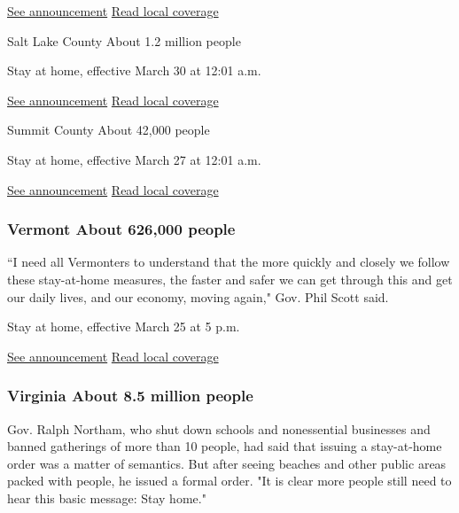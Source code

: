 \href{http://www.co.davis.ut.us/docs/librariesprovider5/covid-19/public-health-order-4-1-20/public-health-order-april-1-2020.pdf?sfvrsn=4b453153_2}{See
announcement} \textbar{}
\href{https://www.sltrib.com/news/2020/04/01/davis-county-issues/}{Read
local coverage}

Salt Lake County About 1.2 million people

Stay at home, effective March 30 at 12:01 a.m.

\href{https://slco.org/globalassets/1-site-files/health/programs/covid/pho/pho3.pdf}{See
announcement} \textbar{}
\href{https://www.sltrib.com/news/2020/03/29/coronavirus-cases-utah/}{Read
local coverage}

Summit County About 42,000 people

Stay at home, effective March 27 at 12:01 a.m.

\href{https://summitcountyhealth.org/public-announcements/3-25-20-summit-county-issues-stay-at-home-order-to-residents/}{See
announcement} \textbar{}
\href{https://www.sltrib.com/news/2020/03/25/summit-county-orders/}{Read
local coverage}

\hypertarget{vermont-about-626000-people}{%
\subsubsection{Vermont About 626,000
people}\label{vermont-about-626000-people}}

``I need all Vermonters to understand that the more quickly and closely
we follow these stay-at-home measures, the faster and safer we can get
through this and get our daily lives, and our economy, moving again,"
Gov. Phil Scott said.

Stay at home, effective March 25 at 5 p.m.

\href{https://governor.vermont.gov/sites/scott/files/documents/ADDENDUM\%206\%20TO\%20EXECUTIVE\%20ORDER\%2001-20.pdf}{See
announcement} \textbar{}
\href{https://www.burlingtonfreepress.com/story/news/local/2020/03/24/vermont-gov-phil-scott-all-vermonters-should-stay-home-order/2909062001/}{Read
local coverage}

\hypertarget{virginia-about-85-million-people}{%
\subsubsection{Virginia About 8.5 million
people}\label{virginia-about-85-million-people}}

Gov. Ralph Northam, who shut down schools and nonessential businesses
and banned gatherings of more than 10 people, had said that issuing a
stay-at-home order was a matter of semantics. But after seeing beaches
and other public areas packed with people, he issued a formal order. "It
is clear more people still need to hear this basic message: Stay home."

